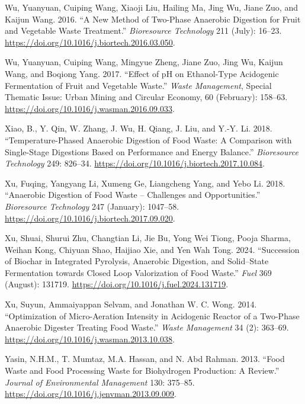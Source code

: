 \documentclass[11pt]{report}
\begin{document}
\begin{hangparas}{1.5em}{1}
\hypertarget{citeproc_bib_item_85}{Wu, Yuanyuan, Cuiping Wang, Xiaoji Liu, Hailing Ma, Jing Wu, Jiane Zuo, and Kaijun Wang. 2016. “A New Method of Two-Phase Anaerobic Digestion for Fruit and Vegetable Waste Treatment.” \textit{Bioresource Technology} 211 (July): 16–23. \url{https://doi.org/10.1016/j.biortech.2016.03.050}.}

\hypertarget{citeproc_bib_item_86}{Wu, Yuanyuan, Cuiping Wang, Mingyue Zheng, Jiane Zuo, Jing Wu, Kaijun Wang, and Boqiong Yang. 2017. “Effect of pH on Ethanol-Type Acidogenic Fermentation of Fruit and Vegetable Waste.” \textit{Waste Management}, Special Thematic Issue: Urban Mining and Circular Economy, 60 (February): 158–63. \url{https://doi.org/10.1016/j.wasman.2016.09.033}.}

\hypertarget{citeproc_bib_item_87}{Xiao, B., Y. Qin, W. Zhang, J. Wu, H. Qiang, J. Liu, and Y.-Y. Li. 2018. “Temperature-Phased Anaerobic Digestion of Food Waste: A Comparison with Single-Stage Digestions Based on Performance and Energy Balance.” \textit{Bioresource Technology} 249: 826–34. \url{https://doi.org/10.1016/j.biortech.2017.10.084}.}

\hypertarget{citeproc_bib_item_88}{Xu, Fuqing, Yangyang Li, Xumeng Ge, Liangcheng Yang, and Yebo Li. 2018. “Anaerobic Digestion of Food Waste – Challenges and Opportunities.” \textit{Bioresource Technology} 247 (January): 1047–58. \url{https://doi.org/10.1016/j.biortech.2017.09.020}.}

\hypertarget{citeproc_bib_item_89}{Xu, Shuai, Shurui Zhu, Changtian Li, Jie Bu, Yong Wei Tiong, Pooja Sharma, Weihan Kong, Chiyuan Shao, Haijiao Xie, and Yen Wah Tong. 2024. “Succession of Biochar in Integrated Pyrolysis, Anaerobic Digestion, and Solid–State Fermentation towards Closed Loop Valorization of Food Waste.” \textit{Fuel} 369 (August): 131719. \url{https://doi.org/10.1016/j.fuel.2024.131719}.}

\hypertarget{citeproc_bib_item_90}{Xu, Suyun, Ammaiyappan Selvam, and Jonathan W. C. Wong. 2014. “Optimization of Micro-Aeration Intensity in Acidogenic Reactor of a Two-Phase Anaerobic Digester Treating Food Waste.” \textit{Waste Management} 34 (2): 363–69. \url{https://doi.org/10.1016/j.wasman.2013.10.038}.}

\hypertarget{citeproc_bib_item_91}{Yasin, N.H.M., T. Mumtaz, M.A. Hassan, and N. Abd Rahman. 2013. “Food Waste and Food Processing Waste for Biohydrogen Production: A Review.” \textit{Journal of Environmental Management} 130: 375–85. \url{https://doi.org/10.1016/j.jenvman.2013.09.009}.}


\end{hangparas}
\end{document}
